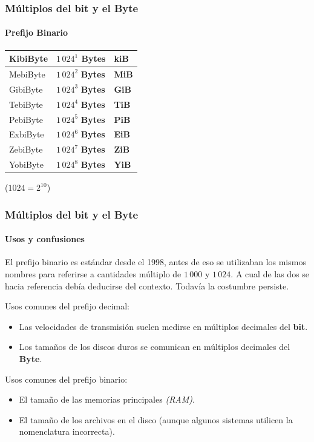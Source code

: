 \documentclass[11pt,a4paper,spanish]{beamer}
\begin{document}
\begin{frame}

\frametitle{Múltiplos del \textbf{bit} y el \textbf{Byte}}

\framesubtitle{Prefijo Binario}

\centering
\begin{tabular}{l l l}
    KibiByte & $1\,024^{1}$ \textbf{Bytes} & \textbf{kiB}\\ \hline
    MebiByte & $1\,024^{2}$ \textbf{Bytes} & \textbf{MiB}\\ \hline
    GibiByte & $1\,024^{3}$ \textbf{Bytes} & \textbf{GiB}\\ \hline
    TebiByte & $1\,024^{4}$ \textbf{Bytes} & \textbf{TiB}\\ \hline
    PebiByte & $1\,024^{5}$ \textbf{Bytes} & \textbf{PiB}\\ \hline
    ExbiByte & $1\,024^{6}$ \textbf{Bytes} & \textbf{EiB}\\ \hline
    ZebiByte & $1\,024^{7}$ \textbf{Bytes} & \textbf{ZiB}\\ \hline
    YobiByte & $1\,024^{8}$ \textbf{Bytes} & \textbf{YiB}\\
\end{tabular}

\tiny ($1024 = 2^{10}$)
\end{frame}

\begin{frame}

\frametitle{Múltiplos del \textbf{bit} y el \textbf{Byte}}

\framesubtitle{Usos y confusiones}

El prefijo binario es estándar desde el 1998, antes de eso se utilizaban los
    mismos nombres para referirse a cantidades múltiplo de $1\,000$ y
    $1\,024$. A cual de las dos se hacia referencia debía deducirse del
    contexto. Todavía la costumbre persiste.

\pause
Usos comunes del prefijo decimal:

\begin{itemize}
    \item Las velocidades de transmisión suelen medirse en múltiplos decimales
        del \textbf{bit}.
    \item Los tamaños de los discos duros se comunican en múltiplos decimales
        del \textbf{Byte}.
\end{itemize}

\pause
Usos comunes del prefijo binario:

\begin{itemize}
    \item El tamaño de las memorias principales \emph{(RAM)}.
    \item El tamaño de los archivos en el disco (aunque algunos sistemas
        utilicen la nomenclatura incorrecta).
\end{itemize}

\end{frame}
\end{document}
